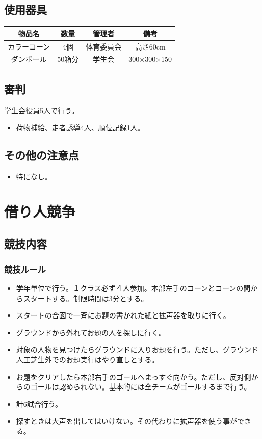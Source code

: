 \documentclass[titlepage]{jarticle}
\begin{document}
  \subsection{使用器具}
   \begin{table}[H]
    \begin{tabular}{cccc}
     物品名&数量&管理者 &備考\\ \hline\hline
     カラーコーン&4個&体育委員会&高さ60cm\\
     ダンボール&50箱分&学生会&300×300×150\\
    \end{tabular}
   \end{table}
  \subsection{審判}
   学生会役員5人で行う。
   \begin{itemize}
    \item 荷物補給、走者誘導4人、順位記録1人。
   \end{itemize}
  \subsection{その他の注意点}
   \begin{itemize}
    \item 特になし。
   \end{itemize}
\clearpage
 \section{借り人競争}
  \subsection{競技内容}
   \subsubsection{競技ルール}
    \begin{itemize}
     \item 学年単位で行う。１クラス必ず４人参加。本部左手のコーンとコーンの間からスタートする。制限時間は3分とする。
     \item スタートの合図で一斉にお題の書かれた紙と拡声器を取りに行く。
     \item グラウンドから外れてお題の人を探しに行く。
     \item 対象の人物を見つけたらグラウンドに入りお題を行う。ただし、グラウンド人工芝生外でのお題実行はやり直しとする。
     \item お題をクリアしたら本部右手のゴールへまっすぐ向かう。ただし、反対側からのゴールは認められない。基本的には全チームがゴールするまで行う。
     \item 計6試合行う。
     \item 探すときは大声を出してはいけない。その代わりに拡声器を使う事ができる。
    \end{itemize}
\end{document}
